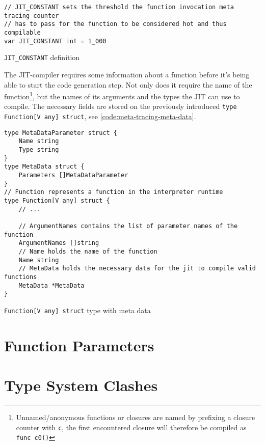 \begin{listing}[H]
    \begin{verbatim}
// JIT_CONSTANT sets the threshold the function invocation meta tracing counter
// has to pass for the function to be considered hot and thus compilable
var JIT_CONSTANT int = 1_000
    \end{verbatim}
    \caption{\texttt{JIT\_CONSTANT} definition}
    \label{code:jit-constant}
\end{listing}

The JIT-compiler requires some information about a function before it's being
able to start the code generation step. Not only does it require the name of
the function\footnote{Unnamed/anonymous functions or closures are named by
    prefixing a closure counter with \texttt{c}, the first encountered closure
will therefore be compiled as \texttt{func c0()}}, but the names of its
arguments and the types the JIT can use to compile. The necessary fields are
stored on the previously introduced \texttt{type Function[V any] struct},
see \autoref{code:meta-tracing-meta-data}.

\begin{listing}[H]
    \begin{verbatim}
type MetaDataParameter struct {
	Name string
	Type string
}
type MetaData struct {
	Parameters []MetaDataParameter
}
// Function represents a function in the interpreter runtime
type Function[V any] struct {
    // ...

    // ArgumentNames contains the list of parameter names of the function
    ArgumentNames []string
    // Name holds the name of the function
    Name string
    // MetaData holds the necessary data for the jit to compile valid functions
    MetaData *MetaData
}
    \end{verbatim}
    \caption{\texttt{Function[V any] struct} type with meta data}
    \label{code:meta-tracing-meta-data}
\end{listing}



\section{Function Parameters}


\section{Type System Clashes}


